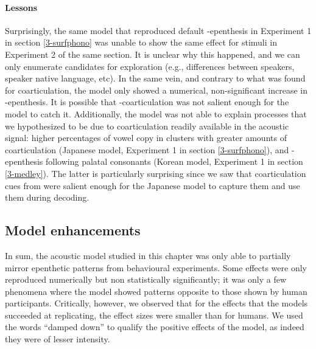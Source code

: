 {\paragraph{Lessons}
Surprisingly, the same model that reproduced default -epenthesis in Experiment 1 in section \ref{3-surfphono} was unable to show the same effect for stimuli in Experiment 2 of the same section. It is unclear why this happened, and we can only enumerate candidates for exploration (e.g., differences between speakers, speaker native language, etc). In the same vein, and contrary to what was found for  coarticulation, the model only showed a numerical, non-significant increase in -epenthesis. It is possible that -coarticulation was not salient enough for the model to catch it. Additionally, the model was not able to explain processes that we hypothesized to be due to coarticulation readily available in the acoustic signal: higher percentages of vowel copy in clusters with greater amounts of coarticulation (Japanese model, Experiment 1 in section \ref{3-surfphono}), and -epenthesis following palatal consonants (Korean model, Experiment 1 in section \ref{3-medley}). The latter is particularly surprising since we saw that coarticulation cues from  were salient enough for the Japanese model to capture them and use them during decoding. 

\subsection{Model enhancements}
In sum, the acoustic model studied in this chapter was only able to partially mirror epenthetic patterns from behavioural experiments. Some effects were only reproduced numerically but non statistically significantly; it was only a few phenomena where the model showed patterns opposite to those shown by human participants. Critically, however, we observed that for the effects that the models succeeded at replicating, the effect sizes were smaller than for humans. We used the words ``damped down'' to qualify the positive effects of the model, as indeed they were of lesser intensity.

}
